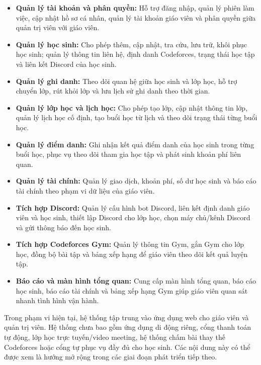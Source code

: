 \documentclass[12pt,a4paper]{article}
\begin{document}
\begin{itemize}[leftmargin=*]
    \item \textbf{Quản lý tài khoản và phân quyền:} Hỗ trợ đăng nhập, quản lý
    phiên làm việc, cập nhật hồ sơ cá nhân, quản lý tài khoản giáo viên và phân
    quyền giữa quản trị viên với giáo viên.

    \item \textbf{Quản lý học sinh:} Cho phép thêm, cập nhật, tra cứu, lưu trữ,
    khôi phục học sinh; quản lý thông tin liên hệ, định danh Codeforces, trạng
    thái học tập và liên kết Discord của học sinh.

    \item \textbf{Quản lý ghi danh:} Theo dõi quan hệ giữa học sinh và lớp học,
    hỗ trợ chuyển lớp, rút khỏi lớp và lưu lịch sử ghi danh theo thời gian.

    \item \textbf{Quản lý lớp học và lịch học:} Cho phép tạo lớp, cập nhật thông
    tin lớp, quản lý lịch học cố định, tạo buổi học từ lịch và theo dõi trạng
    thái từng buổi học.

    \item \textbf{Quản lý điểm danh:} Ghi nhận kết quả điểm danh của học sinh
    trong từng buổi học, phục vụ theo dõi tham gia học tập và phát sinh khoản
    phí liên quan.

    \item \textbf{Quản lý tài chính:} Quản lý giao dịch, khoản phí, số dư học
    sinh và báo cáo tài chính theo phạm vi dữ liệu của giáo viên.

    \item \textbf{Tích hợp Discord:} Quản lý cấu hình bot Discord, liên kết định
    danh giáo viên và học sinh, thiết lập Discord cho lớp học, chọn máy chủ/kênh
    Discord và gửi thông báo đến học sinh.

    \item \textbf{Tích hợp Codeforces Gym:} Quản lý thông tin Gym, gắn Gym cho
    lớp học, đồng bộ bài tập và bảng xếp hạng để giáo viên theo dõi kết quả
    luyện tập.

    \item \textbf{Báo cáo và màn hình tổng quan:} Cung cấp màn hình tổng quan, báo cáo
    học sinh, báo cáo tài chính và bảng xếp hạng Gym giúp giáo viên quan sát
    nhanh tình hình vận hành.
\end{itemize}

Trong phạm vi hiện tại, hệ thống tập trung vào ứng dụng web cho giáo viên và
quản trị viên. Hệ thống chưa bao gồm ứng dụng di động riêng, cổng thanh toán tự
động, lớp học trực tuyến/video meeting, hệ thống chấm bài thay thế Codeforces
hoặc cổng tự phục vụ đầy đủ cho học sinh. Các nội dung này có thể được xem là
hướng mở rộng trong các giai đoạn phát triển tiếp theo.
\end{document}
